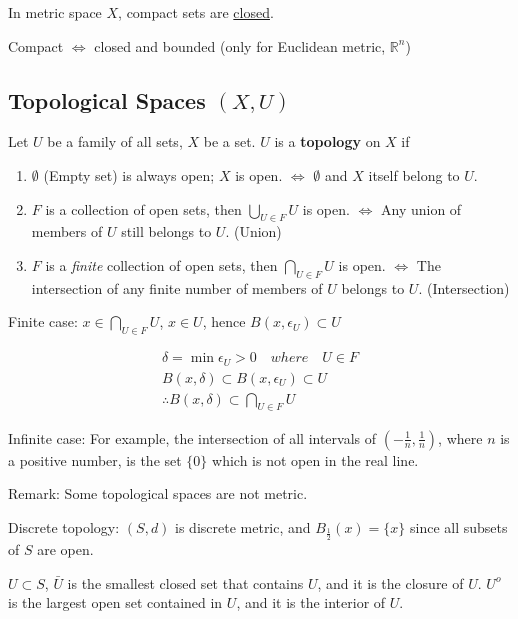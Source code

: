 \documentclass{article}
\begin{document}
        In metric space $X$, compact sets are \underline{closed}.
    
        Compact $\Leftrightarrow$ closed and bounded (only for Euclidean metric, $\mathbb{R}^{n}$)
    
        \subsection{Topological Spaces $(X, U)$}

        Let $U$ be a family of all sets, $X$ be a set. $U$ is a \textbf{topology} on $X$ if

        \begin{enumerate}
            \item $\emptyset$ (Empty set) is always open; $X$ is open. $\Leftrightarrow$ $\emptyset$ and $X$ itself belong to $U$.
            \item $F$ is a collection of open sets, then $\bigcup_{U \in F} U$ is open. $\Leftrightarrow$ Any union of members of $U$ still belongs to $U$. (Union)
            \item $F$ is a \textit{finite} collection of open sets, then $\bigcap_{U \in F} U$ is open. $\Leftrightarrow$ The intersection of any finite number of members of $U$ belongs to $U$. (Intersection)
        \end{enumerate}

        Finite case: $x \in \bigcap_{U \in F} U$, $x \in U$, hence $B(x, \epsilon_{U}) \subset U$

        \begin{gather*}
            \delta = \min \epsilon_{U} > 0 \quad where \quad U \in F \\
            B(x, \delta) \subset B(x, \epsilon_{U}) \subset U \\
            \therefore B(x, \delta) \subset \bigcap_{U \in F} U
        \end{gather*}

        Infinite case: For example, the intersection of all intervals of $( -\frac{1}{n}, \frac{1}{n})$, where $n$ is a positive number, is the set $\{ 0 \}$ which is not open in the real line.
        
        Remark: Some topological spaces are not metric.
        
        Discrete topology: $(S, d)$ is discrete metric, and $B_{\frac{1}{2}} (x) = \{ x \}$ since all subsets of $S$ are open.
        
                $U \subset S$, $\bar{U}$ is the smallest closed set that contains $U$, and it is the closure of $U$. $U^{o}$ is the largest open set contained in $U$, and it is the interior of $U$.
        
\end{document}
